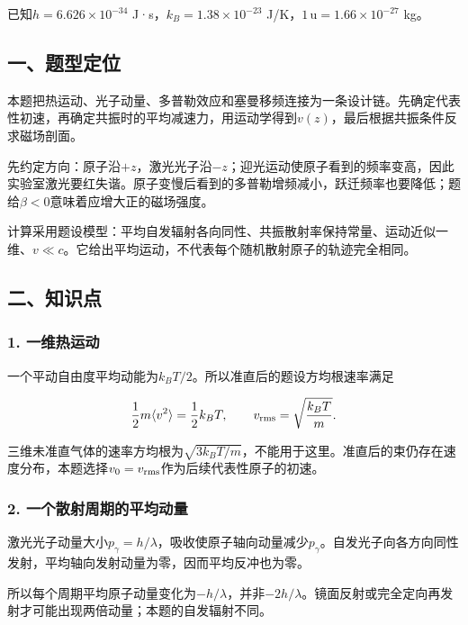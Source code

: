 \documentclass[12pt,a4paper,fontset=fandol]{ctexart}
\begin{document}
已知\(h=6.626\times10^{-34}\) J·s，\(k_B=1.38\times10^{-23}\)
J/K，\(1\,\mathrm u=1.66\times10^{-27}\) kg。

\subsection{一、题型定位}\label{ux4e00ux9898ux578bux5b9aux4f4d-4}

本题把热运动、光子动量、多普勒效应和塞曼移频连接为一条设计链。先确定代表性初速，再确定共振时的平均减速力，用运动学得到\(v(z)\)，最后根据共振条件反求磁场剖面。

先约定方向：原子沿\(+z\)，激光光子沿\(-z\)；迎光运动使原子看到的频率变高，因此实验室激光要红失谐。原子变慢后看到的多普勒增频减小，跃迁频率也要降低；题给\(\beta<0\)意味着应增大正的磁场强度。

计算采用题设模型：平均自发辐射各向同性、共振散射率保持常量、运动近似一维、\(v\ll c\)。它给出平均运动，不代表每个随机散射原子的轨迹完全相同。

\subsection{二、知识点}\label{ux4e8cux77e5ux8bc6ux70b9-4}

\subsubsection{1. 一维热运动}\label{ux4e00ux7ef4ux70edux8fd0ux52a8}

一个平动自由度平均动能为\(k_BT/2\)。所以准直后的题设方均根速率满足

\[
\frac12m\langle v^2\rangle=\frac12k_BT,
\qquad v_{\rm rms}=\sqrt{\frac{k_BT}{m}}.
\]

三维未准直气体的速率方均根为\(\sqrt{3k_BT/m}\)，不能用于这里。准直后的束仍存在速度分布，本题选择\(v_0=v_{\rm rms}\)作为后续代表性原子的初速。

\subsubsection{2.
一个散射周期的平均动量}\label{ux4e00ux4e2aux6563ux5c04ux5468ux671fux7684ux5e73ux5747ux52a8ux91cf}

激光光子动量大小\(p_\gamma=h/\lambda\)，吸收使原子轴向动量减少\(p_\gamma\)。自发光子向各方向同性发射，平均轴向发射动量为零，因而平均反冲也为零。

所以每个周期平均原子动量变化为\(-h/\lambda\)，并非\(-2h/\lambda\)。镜面反射或完全定向再发射才可能出现两倍动量；本题的自发辐射不同。
\end{document}
